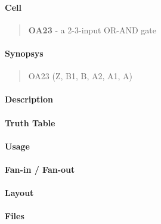 \label{OA23}
\paragraph{Cell}
\begin{quote}
    \textbf{OA23} - a 2-3-input OR-AND gate
\end{quote}

\paragraph{Synopsys}
\begin{quote}
    OA23 (Z, B1, B, A2, A1, A)
\end{quote}

\paragraph{Description}

%

\paragraph{Truth Table}
%

\paragraph{Usage}

\paragraph{Fan-in / Fan-out}

\paragraph{Layout}

\paragraph{Files}

